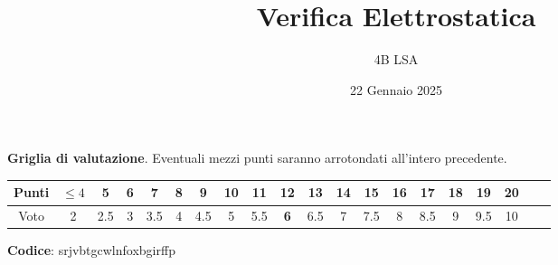 \documentclass{article}
\title{Verifica Elettrostatica}
\author{4B LSA}
\date{22 Gennaio 2025}
\begin{document}
\pagestyle{empty}
\renewcommand{\tablename}{}
\maketitle
\centering
\textbf{Griglia di valutazione}. Eventuali mezzi punti saranno arrotondati all'intero precedente.
\begin{table}[h]
    \centering
\begin{tabular}{|c|c|c|c|c|c|c|c|c|c|c|c|c|c|c|c|c|c|c|c|}
\hline
Punti &  $\leq 4$ & 5 & 6 & 7 & 8 & 9 & 10 & 11 & \textbf{12} & 13 & 14 & 15 & 16 & 17 & 18 & 19 & 20 \\
\hline
Voto & 2 & 2.5 & 3 & 3.5 & 4 & 4.5 & 5 & 5.5 & \textbf{6} & 6.5 & 7 & 7.5 & 8 & 8.5 & 9 & 9.5 & 10 \\
\hline
\end{tabular}
\end{table}


\textbf{Codice}: srjvbtgcwlnfoxbgirffp
\end{document}
